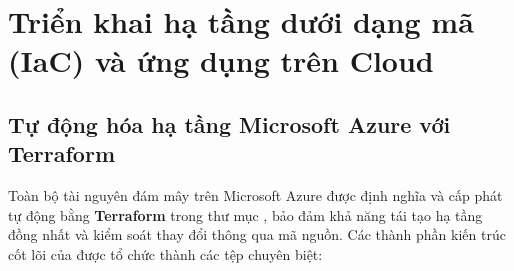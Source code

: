 \section{Triển khai hạ tầng dưới dạng mã (IaC) và ứng dụng trên Cloud}
\label{sec:kien_truc_cloud}

\subsection{Tự động hóa hạ tầng Microsoft Azure với Terraform}
\label{subsec:terraform_azure}

Toàn bộ tài nguyên đám mây trên Microsoft Azure được định nghĩa và cấp phát tự động bằng \textbf{Terraform} trong thư mục , bảo đảm khả năng tái tạo hạ tầng đồng nhất và kiểm soát thay đổi thông qua mã nguồn. Các thành phần kiến trúc cốt lõi của  được tổ chức thành các tệp chuyên biệt:
